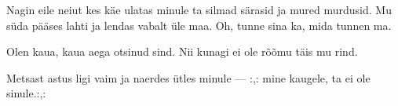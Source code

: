 Nagin eile neiut kes k\"ae ulatas minule
ta silmad s\"arasid ja mured murdusid.
Mu s\"uda p\"a\"ases lahti ja lendas vabalt \"ule maa.
Oh, tunne sina ka, mida tunnen ma.

Olen kaua, kaua aega otsinud sind.
Nii kunagi ei ole r\~o\~omu t\"ais mu rind.

Metsast astus ligi vaim ja naerdes \"utles minule ---
:,: mine kaugele, ta ei ole sinule.:,: